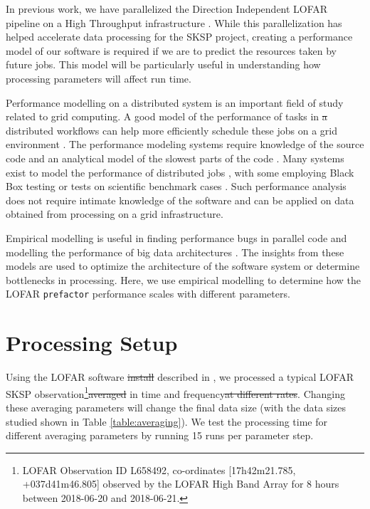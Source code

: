 \documentclass[preprint,5p]{elsarticle}
\providecommand{\DIFadd}[1]{{\protect\color{blue}\uwave{#1}}} %
\providecommand{\DIFdel}[1]{{\protect\color{red}\sout{#1}}}                      %
\providecommand{\DIFaddbegin}{} %
\providecommand{\DIFaddend}{} %
\providecommand{\DIFdelbegin}{} %
\providecommand{\DIFdelend}{} %
\newcommand{\DIFscaledelfig}{0.5}
\newlength{\DIFdelgraphicswidth} %
\newlength{\DIFdelgraphicsheight} %
\newcommand{\DIFaddincludegraphics}[2][]{{\color{blue}\fbox{\DIFOincludegraphics[#1]{#2}}}} %
\newcommand{\DIFdelincludegraphics}[2][]{%
\sbox{\DIFdelgraphicsbox}{\DIFOincludegraphics[#1]{#2}}%
\settoboxwidth{\DIFdelgraphicswidth}{\DIFdelgraphicsbox} %
\settoboxtotalheight{\DIFdelgraphicsheight}{\DIFdelgraphicsbox} %
\scalebox{\DIFscaledelfig}{%
\parbox[b]{\DIFdelgraphicswidth}{\usebox{\DIFdelgraphicsbox}\\[-\baselineskip] \rule{\DIFdelgraphicswidth}{0em}}\llap{\resizebox{\DIFdelgraphicswidth}{\DIFdelgraphicsheight}{%
\setlength{\unitlength}{\DIFdelgraphicswidth}%
\begin{picture}(1,1)%
\thicklines\linethickness{2pt} %
{\color[rgb]{1,0,0}\put(0,0){\framebox(1,1){}}}%
{\color[rgb]{1,0,0}\put(0,0){\line( 1,1){1}}}%
{\color[rgb]{1,0,0}\put(0,1){\line(1,-1){1}}}%
\end{picture}%
}\hspace*{3pt}}} %
} %
\DeclareRobustCommand{\DIFaddbegin}{\DIFOaddbegin \let\includegraphics\DIFaddincludegraphics} %
\DeclareRobustCommand{\DIFaddend}{\DIFOaddend \let\includegraphics\DIFOincludegraphics} %
\DeclareRobustCommand{\DIFdelbegin}{\DIFOdelbegin \let\includegraphics\DIFdelincludegraphics} %
\DeclareRobustCommand{\DIFdelend}{\DIFOaddend \let\includegraphics\DIFOincludegraphics} %
\begin{document}
\DIFaddend In previous work, we have parallelized the Direction Independent LOFAR pipeline on a High Throughput infrastructure \citep{mechev17}. While this parallelization has helped accelerate data processing for the SKSP project, creating a performance model of our software is required if we are to predict the resources taken by future jobs. This model will be particularly useful in understanding how processing parameters will affect run time.  

Performance modelling on a distributed system is an important field of study related to grid computing. A good model of the performance of tasks in \DIFdelbegin \DIFdel{a }\DIFdelend distributed workflows can help more efficiently schedule these jobs on a grid environment \citep{grid_perform_model}. The performance modeling systems require knowledge of the source code and an analytical model of the slowest parts of the code \citep{semi_analytical_model}. Many systems exist to model the performance of distributed jobs \citep{barnes2008regression, semi_analytical_model,performance_prediction,Witt2018PredictivePM}, with some employing Black Box testing \citep{cross_platform_black_box, mapreduce_analysis} or tests on scientific benchmark cases \citep{synthetic_memory_prediction}. Such performance analysis does not require intimate knowledge of the software and can be applied on data obtained from processing on a grid infrastructure.

Empirical modelling is useful in finding performance bugs in parallel code \citep{scalability_bugs} and modelling the performance of big data architectures \citep{mean_field_modeling}. The insights from these models are used to optimize the architecture of the software system or determine bottlenecks in processing. Here, we use empirical modelling to determine how the LOFAR \texttt{prefactor} performance scales with different parameters. 
 \DIFdelbegin %

\DIFdelend \section{Processing Setup }\label{sec:methods}
\DIFaddbegin 

\DIFaddend {}
Using the LOFAR software \DIFdelbegin \DIFdel{install }\DIFdelend \DIFaddbegin \DIFadd{installation }\DIFaddend described in \cite{mechev17}, we processed a typical LOFAR SKSP observation\footnote{LOFAR Observation ID L658492, co-ordinates [17h42m21.785, +037d41m46.805] observed by the LOFAR High Band Array for 8 hours between 2018-06-20 and 2018-06-21.}\DIFdelbegin \DIFdel{averaged }\DIFdelend \DIFaddbegin \DIFadd{, while changing the averaging rate  }\DIFaddend in time and frequency\DIFdelbegin \DIFdel{at different rates}\DIFdelend . Changing these averaging parameters will change the final data size (with the data sizes studied shown in Table \ref{table:averaging}). We test the processing time for different averaging parameters by running 15 runs per parameter step. 
\end{document}
